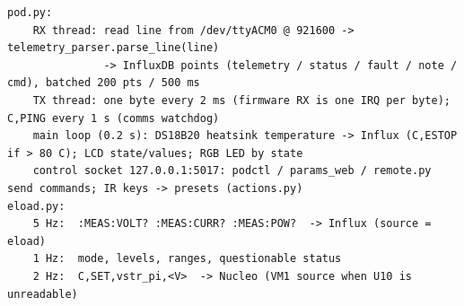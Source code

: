 \begin{lstlisting}[caption={Pi pod main loops (\code{pod.py}, \code{eload.py}).},label={lst:pod}]
pod.py:
    RX thread: read line from /dev/ttyACM0 @ 921600 -> telemetry_parser.parse_line(line)
               -> InfluxDB points (telemetry / status / fault / note / cmd), batched 200 pts / 500 ms
    TX thread: one byte every 2 ms (firmware RX is one IRQ per byte); C,PING every 1 s (comms watchdog)
    main loop (0.2 s): DS18B20 heatsink temperature -> Influx (C,ESTOP if > 80 C); LCD state/values; RGB LED by state
    control socket 127.0.0.1:5017: podctl / params_web / remote.py send commands; IR keys -> presets (actions.py)
eload.py:
    5 Hz:  :MEAS:VOLT? :MEAS:CURR? :MEAS:POW?  -> Influx (source = eload)
    1 Hz:  mode, levels, ranges, questionable status
    2 Hz:  C,SET,vstr_pi,<V>  -> Nucleo (VM1 source when U10 is unreadable)
\end{lstlisting}
